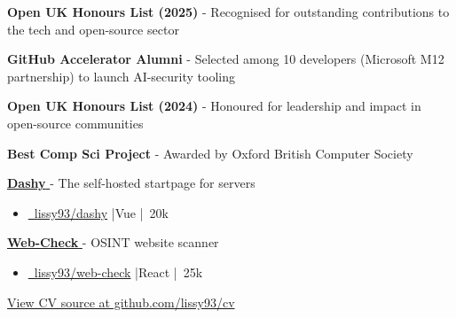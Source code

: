 \documentclass[]{resume-format}
\begin{document}

\vspace{0.5mm}
\begin{cvachievements}
\setlength{\itemsep}{0mm}
  \item { \textbf{ Open UK Honours List (2025) } - Recognised for outstanding contributions to the tech and open-source sector \href{ https://openuk.uk/honours/ }{\scriptsize\color{lightgray}\faLink} }
  \item { \textbf{ GitHub Accelerator Alumni } - Selected among 10 developers (Microsoft M12 partnership) to launch AI-security tooling \href{ https://accelerator.github.com/ }{\scriptsize\color{lightgray}\faLink} }
  \item { \textbf{ Open UK Honours List (2024) } - Honoured for leadership and impact in open-source communities \href{ https://openuk.uk/community/openuk-honours-lists/2024-honours-list }{\scriptsize\color{lightgray}\faLink} }
  \item { \textbf{ Best Comp Sci Project } - Awarded by Oxford British Computer Society \href{ https://oxon.bcs.org/2016/06/27/annual-student-prizes-2016/ }{\scriptsize\color{lightgray}\faLink} }
\end{cvachievements}



\vspace{0.5mm}
\begin{cvachievements}
  \setlength{\itemsep}{0mm}
  \item {
    \href{ https://dashy.to }{ \textbf{ Dashy }}
    - The self-hosted startpage for servers
  }
  \vspace{-1mm}
  \begin{itemize}[leftmargin=4ex, nosep, itemsep=-0.2mm]
    \item {
    \href{https://github.com/lissy93/dashy}{\faGithub\ lissy93/dashy}
      \quad|\quad Vue
      \quad|\quad \faStar\ 20k
    }
  \end{itemize}
  \item {
    \href{ https://web-check.xyz }{ \textbf{ Web-Check }}
    - OSINT website scanner
  }
  \vspace{-1mm}
  \begin{itemize}[leftmargin=4ex, nosep, itemsep=-0.2mm]
    \item {
    \href{https://github.com/lissy93/web-check}{\faGithub\ lissy93/web-check}
      \quad|\quad React
      \quad|\quad \faStar\ 25k
    }
  \end{itemize}
\end{cvachievements}




\vspace{10mm}
\begin{flushleft}
    \tiny\color{lightgray} \href{https://github.com/lissy93/cv}{ View CV source at github.com/lissy93/cv}
\end{flushleft}
\ 
\end{document}
